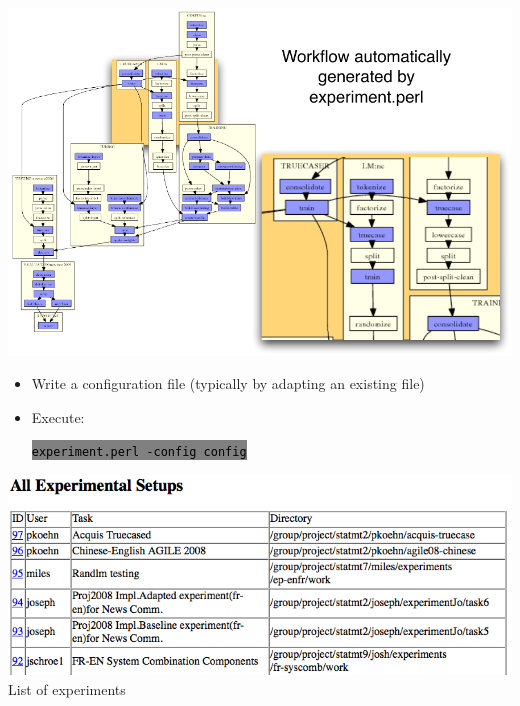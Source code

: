 \documentclass[landscape]{uedslides2C}
\newcommand{\littlecode}[1]{\colorbox{gray}{\textcolor{black}{\small \tt #1}}}
\begin{document}
\slide{}
\begin{center} \vspace{-5mm}
\includegraphics[scale=1.41]{ems-agenda-composite.pdf}
\end{center}


\vspace{30mm}
\begin{itemize}
\item Write a configuration file
(typically by adapting an existing file)
\vspace{15mm}
\item Execute:
\vspace{-10mm}
\begin{center}
\littlecode{\normalsize experiment.perl -config config}
\end{center}
\end{itemize}


\begin{center}
\includegraphics[scale=1]{web-interface-experiments.png}\\[5mm]
List of experiments
\end{center}
\end{document}
